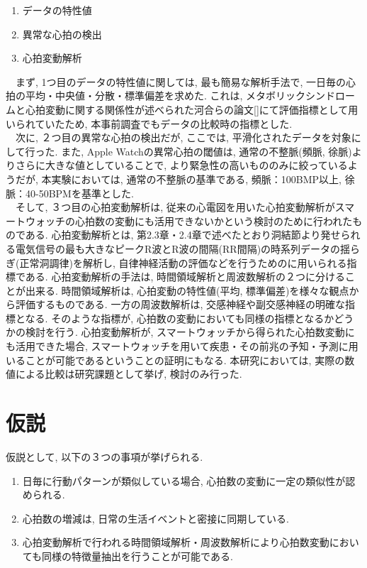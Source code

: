 \documentclass[report, 11pt, a4paper]{jsbook}
\begin{document}
\begin{enumerate}
  \item データの特性値
  \item 異常な心拍の検出
  \item 心拍変動解析
\end{enumerate}

　まず, 1つ目のデータの特性値に関しては, 最も簡易な解析手法で, 一日毎の心拍の平均・中央値・分散・標準偏差を求めた. これは, メタボリックシンドロームと心拍変動に関する関係性が述べられた河合らの論文[]にて評価指標として用いられていたため, 本事前調査でもデータの比較時の指標とした. \\
　次に, ２つ目の異常な心拍の検出だが, ここでは, 平滑化されたデータを対象にして行った. また, Apple Watchの異常心拍の閾値は, 通常の不整脈(頻脈, 徐脈)よりさらに大きな値としていることで, より緊急性の高いもののみに絞っているようだが, 本実験においては, 通常の不整脈の基準である, 頻脈：100BMP以上, 徐脈：40-50BPMを基準とした. \\
　そして, ３つ目の心拍変動解析は, 従来の心電図を用いた心拍変動解析がスマートウォッチの心拍数の変動にも活用できないかという検討のために行われたものである. 心拍変動解析とは, 第2.3章・2.4章で述べたとおり洞結節より発せられる電気信号の最も大きなピークR波とR波の間隔(RR間隔)の時系列データの揺らぎ(正常洞調律)を解析し, 自律神経活動の評価などを行うためのに用いられる指標である. 心拍変動解析の手法は, 時間領域解析と周波数解析の２つに分けることが出来る. 時間領域解析は, 心拍変動の特性値(平均, 標準偏差)を様々な観点から評価するものである. 一方の周波数解析は, 交感神経や副交感神経の明確な指標となる. そのような指標が, 心拍数の変動においても同様の指標となるかどうかの検討を行う.  心拍変動解析が, スマートウォッチから得られた心拍数変動にも活用できた場合, スマートウォッチを用いて疾患・その前兆の予知・予測に用いることが可能であるということの証明にもなる. 本研究においては, 実際の数値による比較は研究課題として挙げ, 検討のみ行った. 

\section{仮説}

仮説として, 以下の３つの事項が挙げられる. 

\begin{enumerate}
  \item 日毎に行動パターンが類似している場合, 心拍数の変動に一定の類似性が認められる.
  \item 心拍数の増減は, 日常の生活イベントと密接に同期している. 
  \item 心拍変動解析で行われる時間領域解析・周波数解析により心拍数変動においても同様の特徴量抽出を行うことが可能である.
\end{enumerate}
\end{document}
